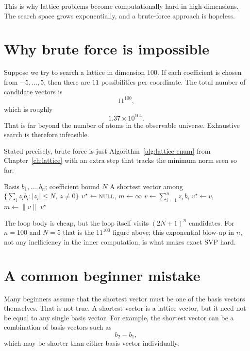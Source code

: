 This is why lattice problems become computationally hard in high dimensions. The search space grows exponentially, and a brute-force approach is hopeless.

\section{Why brute force is impossible}

Suppose we try to search a lattice in dimension $100$. If each coefficient is chosen from $-5,\dots,5$, then there are $11$ possibilities per coordinate. The total number of candidate vectors is
\[
11^{100},
\]
which is roughly
\[
1.37\times 10^{104}.
\]
That is far beyond the number of atoms in the observable universe. Exhaustive search is therefore infeasible.

Stated precisely, brute force is just Algorithm~\ref{alg:lattice-enum} from Chapter~\ref{ch:lattice} with an extra step that tracks the minimum norm seen so far:

\begin{algorithm}[H]
\caption{Brute-Force Shortest Vector Search}
\label{alg:svp-bruteforce}
\begin{algorithmic}[1]
\Require Basis $b_1,\dots,b_n$; coefficient bound $N$
\Ensure A shortest vector among $\{\sum_i z_i b_i : |z_i|\le N,\ z\ne 0\}$
\State $v^\star \gets \textsc{null}$, \quad $m \gets \infty$
    \State $v \gets \sum_{i=1}^{n} z_i\, b_i$
        \State $v^\star \gets v$, \quad $m \gets \|v\|$
    \EndIf
\EndFor
\State \Return $v^\star$
\end{algorithmic}
\end{algorithm}

The loop body is cheap, but the loop itself visits $(2N+1)^n$ candidates. For $n=100$ and $N=5$ that is the $11^{100}$ figure above; this exponential blow-up in $n$, not any inefficiency in the inner computation, is what makes exact SVP hard.

\section{A common beginner mistake}

Many beginners assume that the shortest vector must be one of the basis vectors themselves. That is not true. A shortest vector is a lattice vector, but it need not be equal to any single basis vector. For example, the shortest vector can be a combination of basis vectors such as
\[
 b_2-b_1,
\]
which may be shorter than either basis vector individually.

